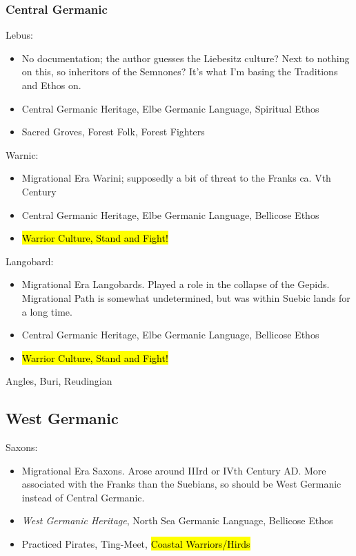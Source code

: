 \documentclass{article}
\begin{document}
	\subsubsection{Central Germanic}
	Lebus:
	\begin{itemize}
		\item No documentation; the author guesses the Liebesitz culture?
		Next to nothing on this, so inheritors of the Semnones?
		It’s what I’m basing the Traditions and Ethos on.
		\item Central Germanic Heritage, Elbe Germanic Language, Spiritual Ethos
		\item Sacred Groves, Forest Folk, Forest Fighters
	\end{itemize}
	
	Warnic:
	\begin{itemize}
		\item Migrational Era Warini; supposedly a bit of threat to the Franks ca. Vth Century
		\item Central Germanic Heritage, Elbe Germanic Language, Bellicose Ethos
		\item \hl{Warrior Culture, Stand and Fight!}
	\end{itemize}
	
	Langobard:
	\begin{itemize}
		\item Migrational Era Langobards.
		Played a role in the collapse of the Gepids.
		Migrational Path is somewhat undetermined, but was within Suebic lands for a long time.
		\item Central Germanic Heritage, Elbe Germanic Language, Bellicose Ethos
		\item \hl{Warrior Culture, Stand and Fight!}
	\end{itemize}
	
	Angles, Buri, Reudingian
	
	\subsection{West Germanic}
	Saxons:
	\begin{itemize}
		\item Migrational Era Saxons.
		Arose around IIIrd or IVth Century AD.
		More associated with the Franks than the Suebians, so should be West Germanic instead of Central Germanic.
		\item \textit{West Germanic Heritage}, North Sea Germanic Language, Bellicose Ethos
		\item Practiced Pirates, Ting-Meet, \hl{Coastal Warriors/Hirds}
	\end{itemize}
	
\end{document}
